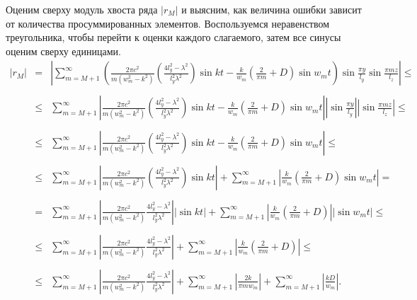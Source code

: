 Оценим сверху модуль хвоста ряда $|r_{M}|$ и выясним, как величина ошибки зависит от количества просуммированных элементов. Воспользуемся неравенством треугольника, чтобы перейти к оценки каждого слагаемого, затем все синусы оценим сверху единицами.
\begin{eqnarray*}
  |r_{M}| &=& \left| \sum \limits_{m=M+1}^{\infty} \left( \frac{2\pi c^2}{m(w_m^2 - k^2)}\left(\frac{4l_y^2 - \lambda^2}{l_y^2\lambda^2} \right)\sin{kt} - \frac{k}{w_m}\left(\frac{2}{\pi m} + D\right)\sin{w_mt} \right) \sin\frac{\pi y}{l_y} \sin\frac{\pi m z}{l_z} \right| \leqslant \\
  \\
  &\leq& \sum \limits_{m=M+1}^{\infty} \left| \frac{2\pi c^2}{m(w_m^2 - k^2)}\left(\frac{4l_y^2 - \lambda^2}{l_y^2\lambda^2} \right)\sin{kt} - \frac{k}{w_m}\left(\frac{2}{\pi m} + D\right)\sin{w_mt} \right| \left| \sin\frac{\pi y}{l_y} \right| \left| \sin\frac{\pi m z}{l_z} \right| \leq \\
  \\
  &\leq& \sum \limits_{m=M+1}^{\infty} \left| \frac{2\pi c^2}{m(w_m^2 - k^2)}\left(\frac{4l_y^2 - \lambda^2}{l_y^2\lambda^2} \right)\sin{kt} - \frac{k}{w_m}\left(\frac{2}{\pi m} + D\right)\sin{w_mt} \right| \leq \\
  \\
  &\leq& \sum \limits_{m=M+1}^{\infty} \left| \frac{2\pi c^2}{m(w_m^2 - k^2)}\left(\frac{4l_y^2 - \lambda^2}{l_y^2\lambda^2} \right)\sin{kt} \right| + \sum \limits_{m=M+1}^{\infty} \left| \frac{k}{w_m}\left(\frac{2}{\pi m} + D\right)\sin{w_mt} \right| = \\
  \\
  &=& \sum \limits_{m=M+1}^{\infty} \left| \frac{2\pi c^2}{m(w_m^2 - k^2)} \frac{4l_y^2 - \lambda^2}{l_y^2\lambda^2} \right| \left| \sin{kt} \right| + \sum \limits_{m=M+1}^{\infty} \left| \frac{k}{w_m}\left(\frac{2}{\pi m} + D\right) \right| \left| \sin{w_mt} \right| \leq \\
  \\
  &\leq& \sum \limits_{m=M+1}^{\infty} \left| \frac{2\pi c^2}{m(w_m^2 - k^2)} \frac{4l_y^2 - \lambda^2}{l_y^2\lambda^2} \right| + \sum \limits_{m=M+1}^{\infty} \left| \frac{k}{w_m}\left(\frac{2}{\pi m} + D\right) \right| \leq \\
  \\
  &\leq& \sum \limits_{m=M+1}^{\infty} \left| \frac{2\pi c^2}{m(w_m^2 - k^2)} \frac{4l_y^2 - \lambda^2}{l_y^2\lambda^2} \right| + \sum \limits_{m=M+1}^{\infty} \left| \frac{2 k}{\pi m w_m} \right| + \sum \limits_{m=M+1}^{\infty} \left| \frac{k D}{w_m} \right|.
\end{eqnarray*}

